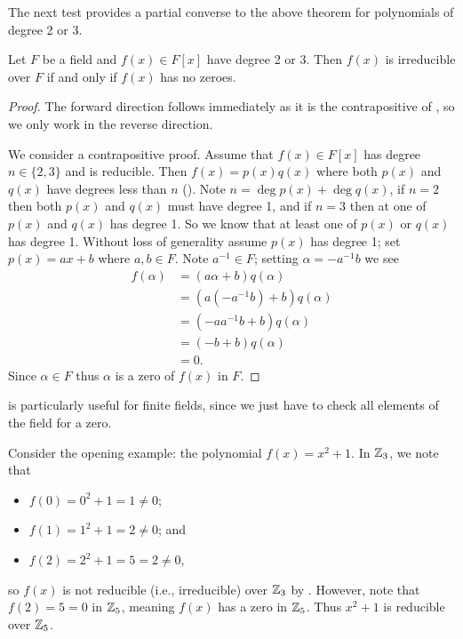 The next test provides a partial converse to the above theorem for polynomials of degree 2 or 3.
\begin{theorem}\label{thrm-degree-2-or-3-irreducible-iff-has-no-zeroes}
    Let $F$ be a field and $f(x) \in F[x]$ have degree 2 or 3. Then $f(x)$ is irreducible over $F$ if and only if $f(x)$ has no zeroes.
\end{theorem}
\begin{proof}
    The forward direction follows immediately as it is the contrapositive of , so we only work in the reverse direction.

    We consider a contrapositive proof. Assume that $f(x) \in F[x]$ has degree $n \in \{2, 3\}$ and is reducible. Then $f(x) = p(x)q(x)$ where both $p(x)$ and $q(x)$ have degrees less than $n$ (). Note $n = \deg p(x) + \deg q(x)$, if $n = 2$ then both $p(x)$ and $q(x)$ must have degree 1, and if $n = 3$ then at one of $p(x)$ and $q(x)$ has degree 1. So we know that at least one of $p(x)$ or $q(x)$ has degree 1. Without loss of generality assume $p(x)$ has degree 1; set $p(x) = ax + b$ where $a,b \in F$. Note $a^{-1} \in F$; setting $\alpha = -a^{-1}b$ we see
    \begin{align*}
        f(\alpha) &= (a\alpha+b)q(\alpha)\\
        &= \left(a\left(-a^{-1}b\right) + b\right)q(\alpha)\\
        &= \left(-aa^{-1}b + b\right)q(\alpha)\\
        &= (-b+b)q(\alpha)\\
        &= 0.
    \end{align*}
    Since $\alpha \in F$ thus $\alpha$ is a zero of $f(x)$ in $F$.
\end{proof}

 is particularly useful for finite fields, since we just have to check all elements of the field for a zero.

\begin{example}
    Consider the opening example: the polynomial $f(x) = x^2 + 1$. In $\mathbb{Z}_3$, we note that
    \begin{itemize}
        \item $f(0) = 0^2 + 1 = 1 \neq 0$;
        \item $f(1) = 1^2 + 1 = 2 \neq 0$; and
        \item $f(2) = 2^2 + 1 = 5 = 2 \neq 0$,
    \end{itemize}
    so $f(x)$ is not reducible (i.e., irreducible) over $\mathbb{Z}_3$ by . However, note that $f(2) = 5 = 0$ in $\mathbb{Z}_5$, meaning $f(x)$ has a zero in $\mathbb{Z}_5$. Thus $x^2 + 1$ is reducible over $\mathbb{Z}_5$.
\end{example}

